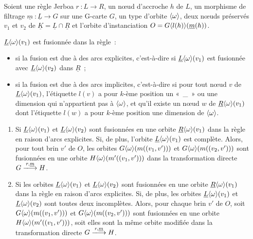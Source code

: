 \begin{proposition}
	Soient une règle Jerboa $r~: L \longrightarrow R$, un n\oe ud d'accroche $h$ de $L$, un morphisme
	de filtrage $\underline{m}~: \underline{L} \rightarrow G$ sur une G-carte $G$, un type
	d'orbite $\langle\omega\rangle$, deux n\oe uds préservés $v_1$ et $v_2$ de
	$\underline{K} = \underline{L} \cap \underline{R}$ et l'orbite d'instanciation
	$O = G\langle l(h)\rangle(\underline{m}(h))$. %

	$\underline{L}\langle\omega\rangle(v_1)$ est fusionnée dans la règle~:

	\begin{itemize}
		\item si la fusion est due à des arcs explicites, c'est-à-dire si
		      $\underline{L}\langle\omega\rangle(v_1)$ est fusionnée avec
		      $\underline{L}\langle\omega\rangle(v_2)$ dans $\underline{R}$~;

		\item si la fusion est due à des arcs implicites, c'est-à-dire si pour tout
		      n\oe ud $v$ de $\underline{L}\langle\omega\rangle(v_1)$, l'étiquette $l(v)$ a pour
		      $k$-ème position un «~\_~» ou une dimension qui n'appartient pas à
		      $\langle\omega\rangle$, et qu'il existe un n\oe ud $w$ de
		      $\underline{R}\langle\omega\rangle(v_1)$ dont l'étiquette $l(w)$ a pour $k$-ème
		      position une dimension de $\langle\omega\rangle$.
	\end{itemize}

	\begin{enumerate}
		\item Si $\underline{L}\langle\omega\rangle(v_1)$ et $\underline{L}\langle\omega\rangle(v_2)$ sont
		      fusionnées en une orbite $\underline{R}\langle\omega\rangle(v_1)$ dans la règle
		      en raison d'arcs explicites. Si, de plus, l'orbite $\underline{L}\langle\omega\rangle(v_1)$
		      est complète. Alors, pour tout brin $v'$ de $O$, les orbites
		      $G\langle\omega\rangle(m((v_1,v')))$ et $G\langle\omega\rangle(m((v_2,v')))$ sont fusionnées
		      en une orbite $H\langle\omega\rangle(m'((v_1,v')))$ dans la transformation
		      directe $G \xlongrightarrow{r,\underline{m}} H$.

		\item Si les orbites $\underline{L}\langle\omega\rangle(v_1)$ et
		      $\underline{L}\langle\omega\rangle(v_2)$ sont fusionnées en une orbite
		      $\underline{R}\langle\omega\rangle(v_1)$ dans la règle en raison d'arcs explicites.
		      Si, de plus, les orbites $\underline{L}\langle\omega\rangle(v_1)$ et
		      $\underline{L}\langle\omega\rangle(v_2)$ sont toutes deux incomplètes. %
		      Alors, pour chaque brin $v'$ de $O$, soit $G\langle\omega\rangle(m((v_1,v')))$ et
		      $G\langle\omega\rangle(m((v_2,v')))$ sont fusionnées en une orbite
		      $H\langle\omega\rangle(m'((v_1,v')))$, soit elles sont la même orbite modifiée
		      dans la transformation directe
		      $G \xlongrightarrow{r, \underline{m}} H$.


\end{enumerate}
\end{proposition}
